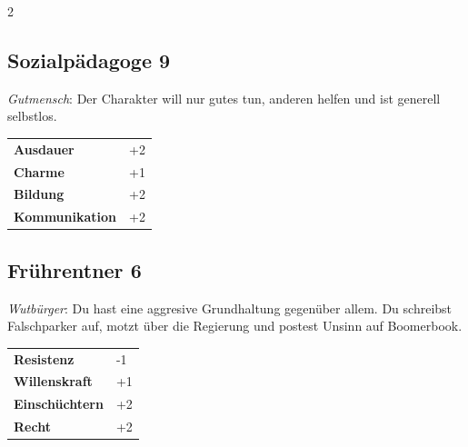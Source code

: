 \begin{multicols}{2}
\begin{tcolorbox}

\end{tcolorbox}

\begin{tcolorbox}
    \subsection*{Sozialpädagoge \hfill \small{9 }}
    \tcblower
\textit{Gutmensch}: Der Charakter will nur gutes tun, anderen helfen und ist generell selbstlos.


\vspace{3mm}

\begin{tabular}{@{}ll@{}}
    \textbf{Ausdauer} & +2\\
    \textbf{Charme} & +1\\
    \textbf{Bildung} & +2\\
    \textbf{Kommunikation} & +2\\
\end{tabular}


\end{tcolorbox}

\begin{tcolorbox}
    \subsection*{Frührentner \hfill \small{6 }}
    \tcblower
\textit{Wutbürger}: Du hast eine aggresive Grundhaltung gegenüber allem. Du schreibst Falschparker auf, motzt über die Regierung und postest Unsinn auf Boomerbook.


\vspace{3mm}

\begin{tabular}{@{}ll@{}}
    \textbf{Resistenz} & -1\\
    \textbf{Willenskraft} & +1\\
    \textbf{Einschüchtern} & +2\\
    \textbf{Recht} & +2\\
\end{tabular}


\end{tcolorbox}
\end{multicols}
